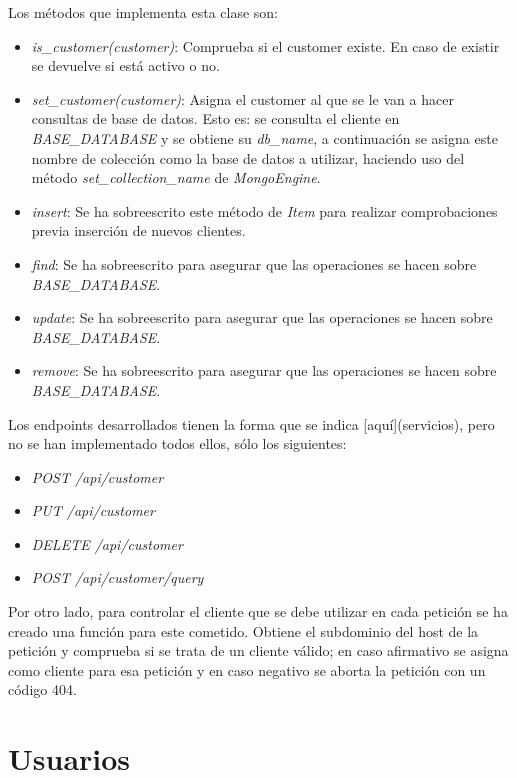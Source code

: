 \bigskip
Los métodos que implementa esta clase son:
\begin{itemize}
	\item \textit{is\_customer(customer)}: Comprueba si el customer existe. En caso de existir se devuelve si está activo o no.
	\item \textit{set\_customer(customer)}: Asigna el customer al que se le van a hacer consultas de base de datos. Esto es: se consulta el cliente en \textit{BASE\_DATABASE} y se obtiene su \textit{db\_name}, a continuación se asigna este nombre de colección como la base de datos a utilizar, haciendo uso del método \textit{set\_collection\_name} de \textit{MongoEngine}.
	\item \textit{insert}: Se ha sobreescrito este método de \textit{Item} para realizar comprobaciones previa inserción de nuevos clientes.
	\item \textit{find}: Se ha sobreescrito para asegurar que las operaciones se hacen sobre \textit{BASE\_DATABASE}.
	\item \textit{update}: Se ha sobreescrito para asegurar que las operaciones se hacen sobre \textit{BASE\_DATABASE}.
	\item \textit{remove}: Se ha sobreescrito para asegurar que las operaciones se hacen sobre \textit{BASE\_DATABASE}.
\end{itemize}


\bigskip
Los endpoints desarrollados tienen la forma que se indica [aquí](servicios), pero no se han implementado todos ellos, sólo los siguientes:
\begin{itemize}
	\item \textit{POST /api/customer}
	\item \textit{PUT /api/customer}
	\item \textit{DELETE /api/customer}
	\item \textit{POST /api/customer/query}
\end{itemize}


\bigskip
Por otro lado, para controlar el cliente que se debe utilizar en cada petición se ha creado una función para este cometido. Obtiene el subdominio del host de la petición y comprueba si se trata de un cliente válido; en caso afirmativo se asigna como cliente para esa petición y en caso negativo se aborta la petición con un código 404.




\section{Usuarios}


